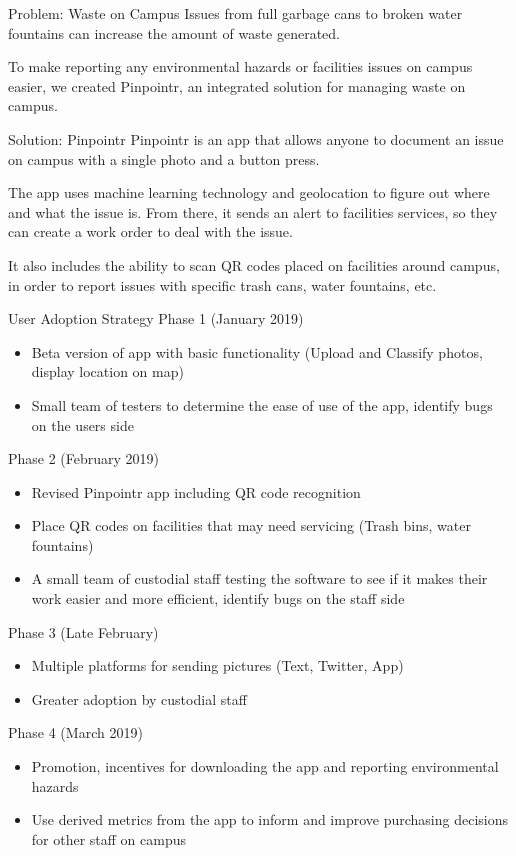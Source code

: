 \documentclass[22pt]{beamer}
\begin{document}
\begin{frame}[fragile]
\begin{textblock}{3.5}
\begin{block}{Problem: Waste on Campus}
Issues from full garbage cans to broken water fountains can increase the amount of waste generated. \par

To make reporting any environmental hazards or facilities issues on campus easier, we created Pinpointr, an integrated solution for managing waste on campus. 
\end{block}

\begin{block}{Solution: Pinpointr}
Pinpointr is an app that allows anyone to document an issue on campus with a single photo and a button press. \par
The app uses machine learning technology and geolocation to figure out where and what the issue is. From there, it sends an alert to facilities services, so they can create a work order to deal with the issue. \par
 It also includes the ability to scan QR codes placed on facilities around campus, in order to report issues with specific trash cans, water fountains, etc.
\end{block}


\begin{block}{User Adoption Strategy}
Phase 1 (January 2019)
\begin{itemize}
\item Beta version of app with basic functionality (Upload and Classify photos, display location on map)
\item Small team of testers to determine the ease of use of the app, identify bugs on the users side
\end{itemize}
Phase 2 (February 2019)
\begin{itemize}
\item Revised Pinpointr app including QR code recognition 
\item Place QR codes on facilities that may need servicing (Trash bins, water fountains)
\item A small team of custodial staff testing the software to see if it makes their work easier and more efficient, identify bugs on the staff side
\end{itemize}
Phase 3 (Late February)
\begin{itemize}
\item Multiple platforms for sending pictures (Text, Twitter, App)
\item Greater adoption by custodial staff
\end{itemize}
Phase 4 (March 2019)
\begin{itemize}
\item Promotion, incentives for downloading the app and reporting environmental hazards
\item Use derived metrics from the app to inform and improve purchasing decisions for other staff on campus
\end{itemize}
\end{block}


\end{textblock}
\end{frame}
\end{document}
